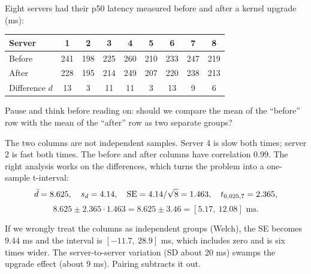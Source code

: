 Eight servers had their p50 latency measured before and after a kernel
upgrade (ms):

\begin{center}
\begin{tabular}{lcccccccc}
\toprule
Server & 1 & 2 & 3 & 4 & 5 & 6 & 7 & 8 \\
\midrule
Before & 241 & 198 & 225 & 260 & 210 & 233 & 247 & 219 \\
After  & 228 & 195 & 214 & 249 & 207 & 220 & 238 & 213 \\
Difference $d$ & 13 & 3 & 11 & 11 & 3 & 13 & 9 & 6 \\
\bottomrule
\end{tabular}
\end{center}

\begin{recoverybox}
Pause and think before reading on: should we compare the mean of the
``before'' row with the mean of the ``after'' row as two separate groups?
\end{recoverybox}

The two columns are not independent samples. Server 4 is slow both times;
server 2 is fast both times. The before and after columns have correlation
0.99. The right analysis works on the differences, which turns the problem into
a one-sample t-interval:
\[
  \bar d = 8.625, \quad s_d = 4.14, \quad \operatorname{SE} = 4.14/\sqrt 8 = 1.463, \quad
  t_{0.025,7} = 2.365,
\]
\[
  8.625 \pm 2.365\cdot 1.463 = 8.625 \pm 3.46 = [5.17,\ 12.08] \text{ ms}.
\]

If we wrongly treat the columns as independent groups (Welch), the SE becomes
$9.44$ ms and the interval is $[-11.7,\ 28.9]$ ms, which includes zero and is
six times wider. The server-to-server variation (SD about 20 ms) swamps the
upgrade effect (about 9 ms). Pairing subtracts it out.

